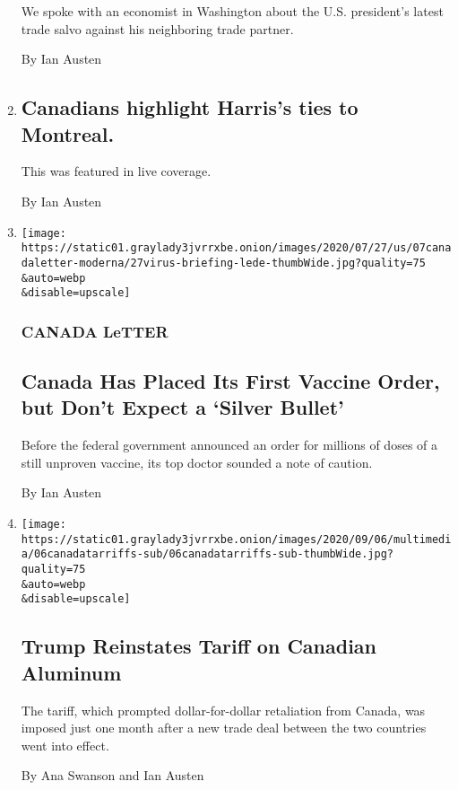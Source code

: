 \begin{enumerate}
  We spoke with an economist in Washington about the U.S. president's
  latest trade salvo against his neighboring trade partner.

  By Ian Austen
\item
  \href{/live/2020/08/11/us/biden-vs-trump/canadians-highlight-harriss-ties-to-montreal}{}

  \hypertarget{canadians-highlight-harriss-ties-to-montreal}{%
  \subsection{Canadians highlight Harris's ties to
  Montreal.}\label{canadians-highlight-harriss-ties-to-montreal}}

  This was featured in live coverage.

  By Ian Austen
\item
  \href{/2020/08/07/world/canada/canada-letter-vaccine.html}{}

  \texttt{[image: https://static01.graylady3jvrrxbe.onion/images/2020/07/27/us/07canadaletter-moderna/27virus-briefing-lede-thumbWide.jpg?quality=75\\\&auto=webp\\\&disable=upscale]}

  \hypertarget{canada-letter-4}{%
  \subsubsection{CANADA LeTTER}\label{canada-letter-4}}

  \hypertarget{canada-has-placed-its-first-vaccine-order-but-dont-expect-a-silver-bullet}{%
  \subsection{Canada Has Placed Its First Vaccine Order, but Don't
  Expect a `Silver
  Bullet'}\label{canada-has-placed-its-first-vaccine-order-but-dont-expect-a-silver-bullet}}

  Before the federal government announced an order for millions of doses
  of a still unproven vaccine, its top doctor sounded a note of caution.

  By Ian Austen
\item
  \href{/2020/08/06/business/economy/trump-canadian-aluminum-tariffs.html}{}

  \texttt{[image: https://static01.graylady3jvrrxbe.onion/images/2020/09/06/multimedia/06canadatarriffs-sub/06canadatarriffs-sub-thumbWide.jpg?quality=75\\\&auto=webp\\\&disable=upscale]}

  \hypertarget{trump-reinstates-tariff-on-canadian-aluminum}{%
  \subsection{Trump Reinstates Tariff on Canadian
  Aluminum}\label{trump-reinstates-tariff-on-canadian-aluminum}}

  The tariff, which prompted dollar-for-dollar retaliation from Canada,
  was imposed just one month after a new trade deal between the two
  countries went into effect.

  By Ana Swanson and Ian Austen
\end{enumerate}

